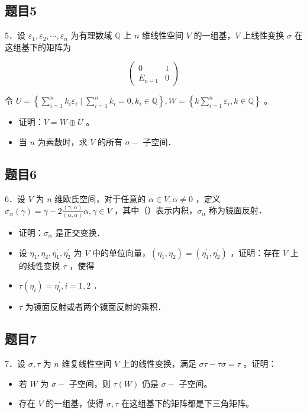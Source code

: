 \documentclass{article}
\begin{document}
\subsection{题目5}
5．设 \(\varepsilon_{1}, \varepsilon_{2}, \cdots, \varepsilon_{n}\) 为有理数域 \(\mathbb{Q}\) 上 \(n\) 维线性空间 \(V\) 的一组基，\(V\) 上线性变换 \(\sigma\) 在这组基下的矩阵为

\[
\left(\begin{array}{cc}
0 & 1 \\
E_{n-1} & 0
\end{array}\right)
\]

令 \(U=\left\{\sum_{i=1}^{n} k_{i} \varepsilon_{i} \mid \sum_{i=1}^{n} k_{i}=0, k_{i} \in \mathbb{Q}\right\}, W=\left\{k \sum_{i=1}^{n} \varepsilon_{i}, k \in \mathbb{Q}\right\}\) 。

\begin{itemize}
  \item[（1）] 证明：\(V=W \oplus U\) 。
  \item[（2）] 当 \(n\) 为素数时，求 \(V\) 的所有 \(\sigma-\) 子空间．
\end{itemize}

\subsection{题目6}
6．设 \(V\) 为 \(n\) 维欧氏空间，对于任意的 \(\alpha \in V, \alpha \neq 0\) ，定义 \(\sigma_{\alpha}(\gamma)=\gamma-2 \frac{(\gamma, \alpha)}{(\alpha, \alpha)} \alpha, \gamma \in V\) ，其中（）表示内积，\(\sigma_{\alpha}\) 称为镜面反射．

\begin{itemize}
  \item[（1）] 证明：\(\sigma_{\alpha}\) 是正交变换．
  \item[（2）] 设 \(\eta_{1}, \eta_{2}, \eta_{1}^{\prime}, \eta_{2}^{\prime}\) 为 \(V\) 中的单位向量，\(\left(\eta_{1}, \eta_{2}\right)=\left(\eta_{1}^{\prime}, \eta_{2}^{\prime}\right)\) ，证明：存在 \(V\) 上的线性变换 \(\tau\) ，使得
  \item[（i）] \(\tau\left(\eta_{i}\right)=\eta_{i}^{\prime}, i=1,2\) ．
  \item[（ii）] \(\tau\) 为镜面反射或者两个镜面反射的乘积．
\end{itemize}

\subsection{题目7}
7．设 \(\sigma, \tau\) 为 \(n\) 维复线性空间 \(V\) 上的线性变换，满足 \(\sigma \tau-\tau \sigma=\tau\) 。证明：

\begin{itemize}
  \item[（1）] 若 \(W\) 为 \(\sigma-\) 子空间，则 \(\tau(W)\) 仍是 \(\sigma-\) 子空间。
  \item[（2）] 存在 \(V\) 的一组基，使得 \(\sigma, \tau\) 在这组基下的矩阵都是下三角矩阵。
\end{itemize}
\end{document}
